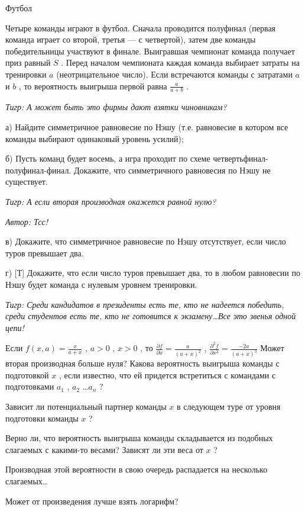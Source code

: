 \begin{problem}
 Футбол\par
Четыре команды играют в футбол. Сначала проводится полуфинал (первая команда играет со второй, третья — с четвертой), затем две команды победительницы участвуют в финале. Выигравшая чемпионат команда получает приз равный  $S$ . Перед началом чемпионата каждая команда выбирает затраты на тренировки  $a$  (неотрицательное число). Если встречаются команды с затратами  $a$  и  $b$ , то вероятность выигрыша первой равна  $\frac{a}{a+b} $ .\par
{\it Тигр: А может быть это фирмы дают взятки чиновникам?}\par
а) Найдите симметричное  равновесие  по Нэшу (т.е. равновесие в котором все команды выбирают одинаковый уровень усилий);\par
б) Пусть команд будет восемь, а игра проходит по схеме четвертьфинал-полуфинал-финал. Докажите, что симметричного равновесия по Нэшу не существует.\par
{\it Тигр: А если вторая производная  окажется равной нулю?}\par
{\it  Автор: Тсс!}\par
в) Докажите, что симметричное равновесие по Нэшу отсутствует, если число туров превышает два.\par
г) [Т] Докажите, что если число туров превышает два, то в любом равновесии по Нэшу будет команда с нулевым уровнем тренировки.\par
{\it Тигр: Среди кандидатов в президенты есть те, кто не надеется победить, среди студентов есть те, кто не готовится к экзамену\ldots Все это звенья одной цепи!}




\begin{sol}
Если  $f\left(x,a\right)=\frac{x}{a+x} $ ,  $a>0$ ,  $x>0$ , то  $\frac{\partial f}{\partial x} =\frac{a}{\left(a+x\right)^{2} } $ ,  $\frac{\partial ^{2} f}{\partial x^{2} } =\frac{-2a}{\left(a+x\right)^{3} } $
Может вторая производная больше нуля?
Какова вероятность выигрыша команды с подготовкой  $x$ , если известно, что ей придется встретиться с командами с подготовками  $a_{1} $ ,  $a_{2} $ \ldots  $a_{n} $ ? \par
Зависит ли потенциальный партнер команды  $x$  в следующем туре от уровня подготовки команды  $x$ ?\par
Верно ли, что вероятность выигрыша команды складывается из подобных слагаемых с какими-то весами? Зависят ли эти веса от  $x$ ?\par
Производная этой вероятности в свою очередь распадается на несколько слагаемых\ldots \par
Может от произведения лучше взять логарифм?
\end{sol}
\end{problem}



